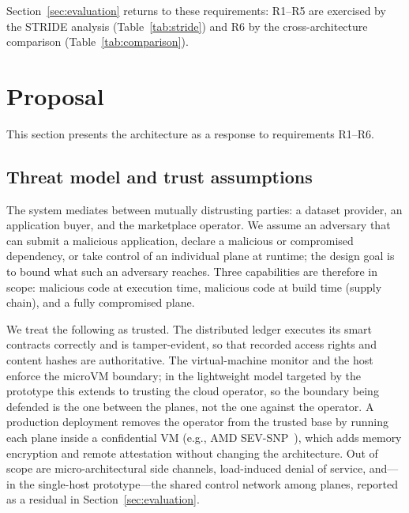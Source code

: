 \documentclass[runningheads]{llncs}
\begin{document}
\noindent Section~\ref{sec:evaluation} returns to these requirements:
R1--R5 are exercised by the STRIDE analysis (Table~\ref{tab:stride}) and
R6 by the cross-architecture comparison (Table~\ref{tab:comparison}).

\section{Proposal}\label{sec:proposal}

This section presents the architecture as a response to requirements R1--R6.

\subsection{Threat model and trust assumptions}
The system mediates between mutually distrusting parties: a dataset provider, an application
buyer, and the marketplace operator. We assume an adversary that can submit a malicious
application, declare a malicious or compromised dependency, or take control of an individual
plane at runtime; the design goal is to bound what such an adversary reaches. Three
capabilities are therefore in scope: malicious code at execution time, malicious code at
build time (supply chain), and a fully compromised plane.

We treat the following as trusted. The distributed ledger executes its smart contracts
correctly and is tamper-evident, so that recorded access rights and content hashes are
authoritative. The virtual-machine monitor and the host enforce the microVM boundary; in the
lightweight model targeted by the prototype this extends to trusting the cloud operator, so
the boundary being defended is the one between the planes, not the one against the operator.
A production deployment removes the operator from the trusted base by running each plane
inside a confidential VM (e.g., AMD SEV-SNP~\cite{amd2020sevsnp}), which adds memory
encryption and remote attestation without changing the architecture. Out of scope are
micro-architectural side channels, load-induced denial of service, and---in the single-host
prototype---the shared control network among planes, reported as a residual in
Section~\ref{sec:evaluation}.
\end{document}
